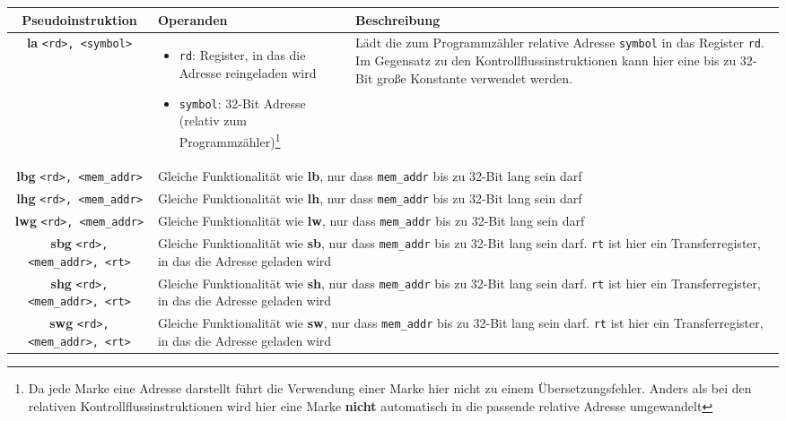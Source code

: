 \begin{tabular}{|c|p{5cm}|p{5cm}|}
	\hline
	Pseudoinstruktion & Operanden & Beschreibung\\
	\hline
	\textbf{la} \texttt{<rd>, <symbol>} & 
	\begin{itemize}
		\item \texttt{rd}: Register, in das die Adresse reingeladen wird\
		\item \texttt{symbol}: 32-Bit Adresse (relativ zum Programmzähler)\footnote{\label{user-manual-riscv-overview-pseudos-foot1}Da jede Marke eine Adresse darstellt führt die Verwendung einer Marke hier nicht zu einem Übersetzungsfehler. Anders als bei den relativen Kontrollflussinstruktionen wird hier eine Marke \textbf{nicht} automatisch in die passende relative Adresse umgewandelt}
	\end{itemize}
	& Lädt die zum Programmzähler relative Adresse \texttt{symbol} in das Register \texttt{rd}. Im Gegensatz zu den Kontrollflussinstruktionen kann hier eine bis zu 32-Bit große Konstante verwendet werden.\\
	\hline
	\textbf{lbg} \texttt{<rd>, <mem\_addr>} &
	\multicolumn{2}{|p{10cm}|}{Gleiche Funktionalität wie \textbf{lb}, nur dass \texttt{mem\_addr} bis zu 32-Bit lang sein darf}\\
	\hline
	\textbf{lhg} \texttt{<rd>, <mem\_addr>} &
	\multicolumn{2}{|p{10cm}|}{Gleiche Funktionalität wie \textbf{lh}, nur dass \texttt{mem\_addr} bis zu 32-Bit lang sein darf}\\
	\hline
	\textbf{lwg} \texttt{<rd>, <mem\_addr>} &
	\multicolumn{2}{|p{10cm}|}{Gleiche Funktionalität wie \textbf{lw}, nur dass \texttt{mem\_addr} bis zu 32-Bit lang sein darf}\\
	\hline
	\textbf{sbg} \texttt{<rd>, <mem\_addr>, <rt>} &
	\multicolumn{2}{|p{10cm}|}{Gleiche Funktionalität wie \textbf{sb}, nur dass \texttt{mem\_addr} bis zu 32-Bit lang sein darf. \texttt{rt} ist hier ein Transferregister, in das die Adresse geladen wird}\\
	\hline
	\textbf{shg} \texttt{<rd>, <mem\_addr>, <rt>} &
	\multicolumn{2}{|p{10cm}|}{Gleiche Funktionalität wie \textbf{sh}, nur dass \texttt{mem\_addr} bis zu 32-Bit lang sein darf. \texttt{rt} ist hier ein Transferregister, in das die Adresse geladen wird}\\
	\hline
	\textbf{swg} \texttt{<rd>, <mem\_addr>, <rt>} &
	\multicolumn{2}{|p{10cm}|}{Gleiche Funktionalität wie \textbf{sw}, nur dass \texttt{mem\_addr} bis zu 32-Bit lang sein darf. \texttt{rt} ist hier ein Transferregister, in das die Adresse geladen wird}\\

\end{tabular}
